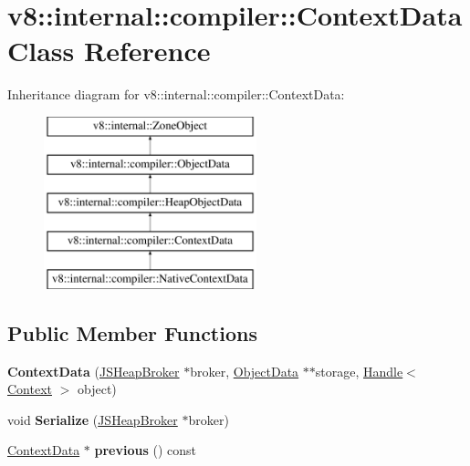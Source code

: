 \hypertarget{classv8_1_1internal_1_1compiler_1_1ContextData}{}\section{v8\+:\+:internal\+:\+:compiler\+:\+:Context\+Data Class Reference}
\label{classv8_1_1internal_1_1compiler_1_1ContextData}
Inheritance diagram for v8\+:\+:internal\+:\+:compiler\+:\+:Context\+Data\+:\begin{figure}[H]
\begin{center}
\leavevmode
\includegraphics[height=5.000000cm]{classv8_1_1internal_1_1compiler_1_1ContextData}
\end{center}
\end{figure}
\subsection*{Public Member Functions}
\begin{DoxyCompactItemize}
\item 
\mbox{\label{classv8_1_1internal_1_1compiler_1_1ContextData_a0e921a88db131777998605d5182a6cb6}} 
{\bfseries Context\+Data} (\mbox{\hyperlink{classv8_1_1internal_1_1compiler_1_1JSHeapBroker}{J\+S\+Heap\+Broker}} $\ast$broker, \mbox{\hyperlink{classv8_1_1internal_1_1compiler_1_1ObjectData}{Object\+Data}} $\ast$$\ast$storage, \mbox{\hyperlink{classv8_1_1internal_1_1Handle}{Handle}}$<$ \mbox{\hyperlink{classv8_1_1internal_1_1Context}{Context}} $>$ object)
\item 
\mbox{\label{classv8_1_1internal_1_1compiler_1_1ContextData_ad616e276ba241840434bfd307b70108d}} 
void {\bfseries Serialize} (\mbox{\hyperlink{classv8_1_1internal_1_1compiler_1_1JSHeapBroker}{J\+S\+Heap\+Broker}} $\ast$broker)
\item 
\mbox{\label{classv8_1_1internal_1_1compiler_1_1ContextData_a8d902eab4853889db3dc47d2c951af8d}} 
\mbox{\hyperlink{classv8_1_1internal_1_1compiler_1_1ContextData}{Context\+Data}} $\ast$ {\bfseries previous} () const
\end{DoxyCompactItemize}
